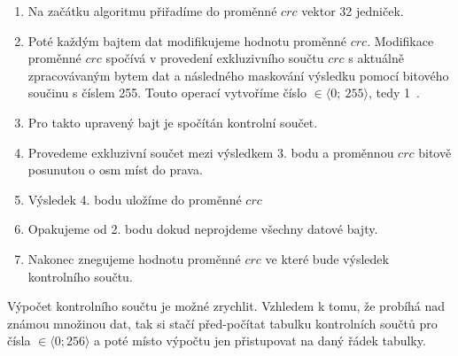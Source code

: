 

\begin{enumerate}
    \item Na začátku algoritmu přiřadíme do proměnné $crc$ vektor 32 jedniček.
    \item Poté každým bajtem dat modifikujeme hodnotu proměnné $crc$. Modifikace proměnné $crc$ spočívá v provedení exkluzivního součtu $crc$ s aktuálně zpracovávaným bytem dat a následného maskování výsledku pomocí bitového součinu s číslem 255. Touto operací vytvoříme číslo $\in \langle 0;~255 \rangle$, tedy 1~.
    \item Pro takto upravený bajt je spočítán kontrolní součet.
    \item Provedeme exkluzivní součet mezi výsledkem 3. bodu a proměnnou $crc$ bitově posunutou o osm míst do prava.
    \item Výsledek 4. bodu uložíme do proměnné $crc$
    \item Opakujeme od 2. bodu dokud neprojdeme všechny datové bajty.
    \item Nakonec znegujeme hodnotu proměnné $crc$ ve které bude výsledek kontrolního součtu.
\end{enumerate}


Výpočet kontrolního součtu je možné zrychlit. Vzhledem k tomu, že probíhá nad známou množinou dat, tak si stačí před-počítat tabulku kontrolních součtů pro čísla $\in \langle 0; 256 \rangle$ a poté místo výpočtu jen přistupovat na daný řádek tabulky.
